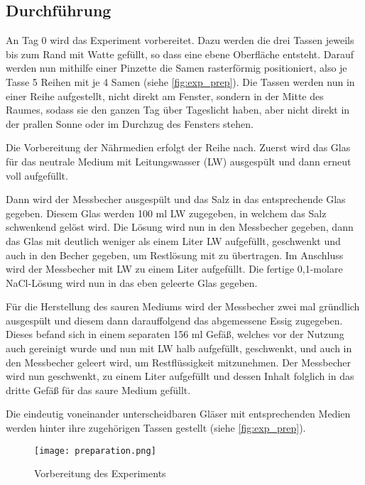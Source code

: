     \newpage
    \subsection{Durchführung} %
        \label{sub:durchführung}
        An Tag 0 wird das Experiment vorbereitet. Dazu werden die drei Tassen jeweils bis zum Rand mit Watte gefüllt, so dass eine ebene Oberfläche entsteht. Darauf werden nun mithilfe einer Pinzette die Samen rasterförmig positioniert, also je Tasse 5 Reihen mit je 4 Samen (siehe \autoref{fig:exp_prep}). Die Tassen werden nun in einer Reihe aufgestellt, nicht direkt am Fenster, sondern in der Mitte des Raumes, sodass sie den ganzen Tag über Tageslicht haben, aber nicht direkt in der prallen Sonne oder im Durchzug des Fensters stehen.

        Die Vorbereitung der Nährmedien erfolgt der Reihe nach. Zuerst wird das Glas für das neutrale Medium mit Leitungswasser (LW) ausgespült und dann erneut voll aufgefüllt.

        Dann wird der Messbecher ausgespült und das Salz in das entsprechende Glas gegeben. Diesem Glas werden 100 ml LW zugegeben, in welchem das Salz schwenkend gelöst wird. Die Lösung wird nun in den Messbecher gegeben, dann das Glas mit deutlich weniger als einem Liter LW aufgefüllt, geschwenkt und auch in den Becher gegeben, um Restlösung mit zu übertragen. Im Anschluss wird der Messbecher mit LW zu einem Liter aufgefüllt. Die fertige 0,1-molare NaCl-Lösung wird nun in das eben geleerte Glas gegeben.

        Für die Herstellung des sauren Mediums wird der Messbecher zwei mal gründlich ausgespült und diesem dann darauffolgend das abgemessene Essig zugegeben. Dieses befand sich in einem separaten 156 ml Gefäß, welches vor der Nutzung auch gereinigt wurde und nun mit LW halb aufgefüllt, geschwenkt, und auch in den Messbecher geleert wird, um Restflüssigkeit mitzunehmen. Der Messbecher wird nun geschwenkt, zu einem Liter aufgefüllt und dessen Inhalt folglich in das dritte Gefäß für das saure Medium gefüllt.

        Die eindeutig voneinander unterscheidbaren Gläser mit entsprechenden Medien werden hinter ihre zugehörigen Tassen gestellt (siehe \autoref{fig:exp_prep}).
        \begin{figure}[h]
            \centering
            \texttt{[image: preparation.png]}
            \caption{Vorbereitung des Experiments}
            \label{fig:exp_prep}
        \end{figure}

